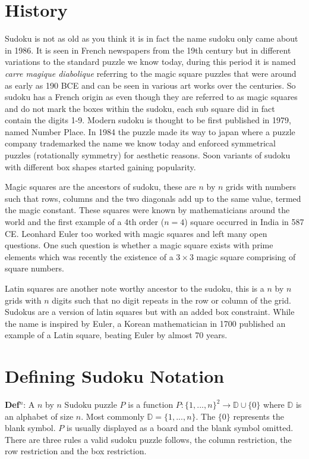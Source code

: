 \documentclass[a4paper,11pt]{report}
\newcounter{row}
\newcounter{col}
\begin{document}
\section{History}

Sudoku is not as old as you think it is in fact the name sudoku only came about in 1986. It is seen in French newspapers from the 19th century but in different variations to the standard puzzle we know today, during this period it is named \textit{carre magique diabolique} referring to the magic square puzzles that were around as early as 190 BCE and can be seen in various art works over the centuries. So sudoku has a French origin as even though they are referred to as magic squares and do not mark the boxes within the sudoku, each sub square did in fact contain the digits 1-9. Modern sudoku is thought to be first published in 1979, named Number Place. In 1984 the puzzle made its way to japan where a puzzle company trademarked the name we know today and enforced symmetrical puzzles (rotationally symmetry) for aesthetic reasons. Soon variants of sudoku with different box shapes started gaining popularity.

Magic squares are the ancestors of sudoku, these are $n$ by $n$ grids with numbers such that rows, columns and the two diagonals add up to the same value, termed the magic constant. These squares were known by mathematicians around the world and the first example of a 4th order ($n=4$) square occurred in India in 587 CE. Leonhard Euler too worked with magic squares \cite{euler1779quadratis} and left many open questions. One such question is whether a magic square exists with prime elements which was recently  the existence of a $3\times 3$ magic square comprising of square numbers.

Latin squares are another note worthy ancestor to the sudoku, this is a $n$ by $n$ grids with $n$ digits such that no digit repeats in the row or column of the grid. Sudokus are a version of latin squares but with an added box constraint. While the name is inspired by Euler, a Korean mathematician in 1700 published an example of a Latin square, beating Euler by almost 70 years. 
	
\section{Defining Sudoku Notation}
	
\textbf{Def$^n$}: A $n$ by $n$ Sudoku puzzle $P$ is a function $P:  \{1,...,n\}^2\rightarrow\mathbb D \cup \{0\}$ where $\mathbb D$ is an alphabet of size $n$. Most commonly $\mathbb D = \{1,...,n\}$. The $\{0\}$ represents the blank symbol. $P$ is usually displayed as a board and the blank symbol omitted. There are three rules a valid sudoku puzzle follows, the column restriction, the row restriction and the box restriction.
\end{document}
